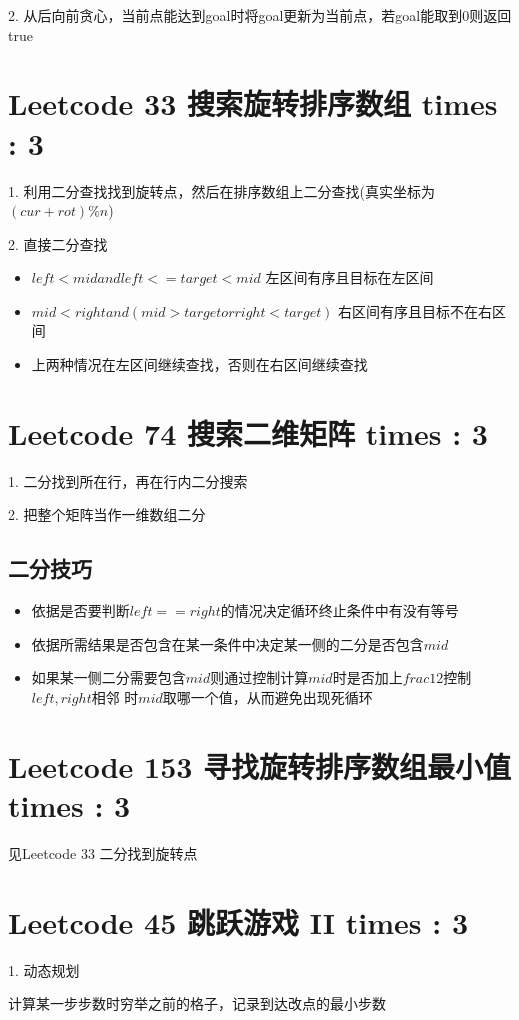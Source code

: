 \documentclass[UTF8]{ctexart}
\begin{document}
2. 从后向前贪心，当前点能达到goal时将goal更新为当前点，若goal能取到0则返回true

\section{Leetcode 33 搜索旋转排序数组 times : 3}
1. 利用二分查找找到旋转点，然后在排序数组上二分查找(真实坐标为$(cur + rot) \% n$)

2. 直接二分查找
\begin{itemize}
	\item $left < mid and left <= target < mid$ 左区间有序且目标在左区间
	\item $mid < right and (mid > target or right < target)$ 右区间有序且目标不在右区间
	\item 上两种情况在左区间继续查找，否则在右区间继续查找
\end{itemize}

\section{Leetcode 74 搜索二维矩阵 times : 3}
1. 二分找到所在行，再在行内二分搜索

2. 把整个矩阵当作一维数组二分

\subsection{二分技巧}
\begin{itemize}
	\item 依据是否要判断$left == right$的情况决定循环终止条件中有没有等号
	\item 依据所需结果是否包含在某一条件中决定某一侧的二分是否包含$mid$
	\item 如果某一侧二分需要包含$mid$则通过控制计算$mid$时是否加上$frac{1}{2}$控制$left, right$相邻
		时$mid$取哪一个值，从而避免出现死循环
\end{itemize}

\section{Leetcode 153 寻找旋转排序数组最小值 times : 3}
见Leetcode 33 二分找到旋转点

\section{Leetcode 45 跳跃游戏 II times : 3}
1. 动态规划

计算某一步步数时穷举之前的格子，记录到达改点的最小步数
\end{document}
